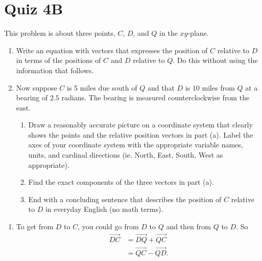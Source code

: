 \documentclass{ximera}
\begin{document}
\section{Quiz 4B}

\begin{question} \label{Qpv39}
This problem is about three points, $C$, $D$, and $Q$ in the $xy$-plane.

\begin{enumerate}

\item Write an equation with vectors that expresses the position of $C$ relative to $D$ in terms of the positions of $C$ and $D$ relative to $Q$. Do this without using the information that follows.

\item Now suppose $C$ is 5 miles due south of $Q$ and that $D$ is $10$ miles from $Q$ at a bearing of $2.5$ radians. The bearing is measured counterclockwise from the east.

\begin{enumerate}

\item Draw a  reasonably accurate picture on a coordinate system that clearly shows the points and the relative position vectors in part (a). Label the axes of your coordinate system with the appropriate variable names, units, and cardinal directions (ie. North, East, South, West as appropriate).

\item Find the exact components of the three vectors in part (a).

\item End with a concluding sentence that describes the position of $C$ relative to $D$ in everyday English (no math terms).

\end{enumerate}
\end{enumerate}

\begin{explanation}
\begin{enumerate}
\item To get from $D$ to $C$, you could go from $D$ to $Q$ and then from $Q$ to $D$. So
\begin{align*}
 \overrightarrow{DC} &= \overrightarrow{DQ} + \overrightarrow{QC} \\
                               &= \overrightarrow{QC} - \overrightarrow{QD} .
\end{align*}


\end{enumerate}
\end{explanation}
\end{question}
\end{document}
